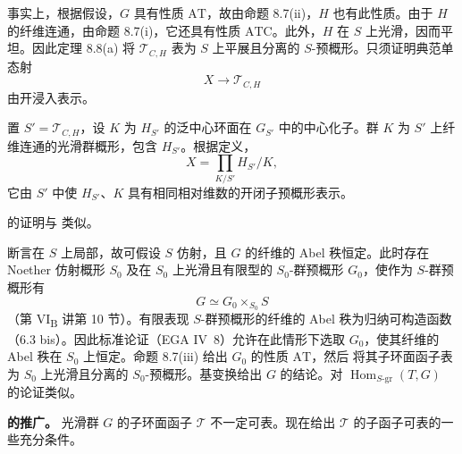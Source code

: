 事实上，根据假设，\(G\) 具有性质 \(\mathrm{AT}\)，故由命题 8.7(ii)，\(H\) 也有此性质。由于 \(H\) 的纤维连通，由命题 8.7(i)，它还具有性质 \(\mathrm{ATC}\)。此外，\(H\) 在 \(S\) 上光滑，因而平坦。因此定理 8.8(a) 将 \(\mathcal T_{C,H}\) 表为 \(S\) 上平展且分离的 \(S\)-预概形。只须证明典范单态射
\[
  X\longrightarrow\mathcal T_{C,H}
\]
由开浸入表示。

置 \(S'=\mathcal T_{C,H}\)，设 \(K\) 为 \(H_{S'}\) 的泛中心环面在 \(G_{S'}\) 中的中心化子。群 \(K\) 为 \(S'\) 上纤维连通的光滑群概形，包含 \(H_{S'}\)。根据定义，
\[
  X=\prod_{K/S'} H_{S'}/K,
\]
它由 \(S'\) 中使 \(H_{S'}\)、\(K\) 具有相同相对维数的开闭子预概形表示。

 的证明与 类似。


断言在 \(S\) 上局部，故可假设 \(S\) 仿射，且 \(G\) 的纤维的 Abel 秩恒定。此时存在 Noether 仿射概形 \(S_0\) 及在 \(S_0\) 上光滑且有限型的 \(S_0\)-群预概形 \(G_0\)，使作为 \(S\)-群预概形有
\[
  G\simeq G_0\times_{S_0}S
\]
（第 VI\textsubscript{B} 讲第 10 节）。有限表现 \(S\)-群预概形的纤维的 Abel 秩为归纳可构造函数（6.3 bis）。因此标准论证（EGA IV~8）允许在此情形下选取 \(G_0\)，使其纤维的 Abel 秩在 \(S_0\) 上恒定。命题 8.7(iii) 给出 \(G_0\) 的性质 \(\mathrm{AT}\)，然后 将其子环面函子表为 \(S_0\) 上光滑且分离的 \(S_0\)-预概形。基变换给出 \(G\) 的结论。对 \(\operatorname{Hom}_{S\text{-gr}}(T,G)\) 的论证类似。

\medskip\noindent\textbf{ 的推广。}
光滑群 \(G\) 的子环面函子 \(\mathcal T\) 不一定可表。现在给出 \(\mathcal T\) 的子函子可表的一些充分条件。

